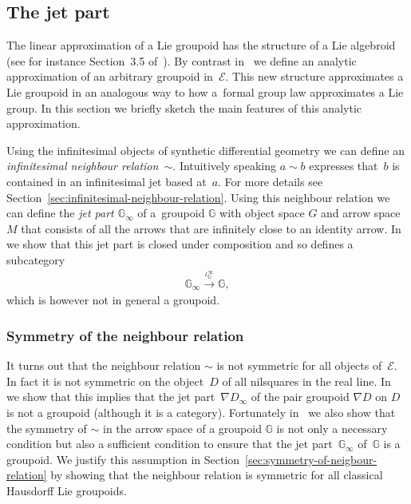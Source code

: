 \documentclass[pdftex]{sigma}
\numberwithin{equation}{section}
\begin{document}
\subsection{The jet part}

The linear approximation of a Lie groupoid has the structure of a Lie algebroid (see for instance Section~3.5 of~\cite{MR2157566}). By contrast in~\cite{burke-relative-to-local-models} we def\/ine an analytic approximation of an arbitrary groupoid in~$\mathcal{E}$. This new structure approximates a Lie groupoid in an analogous way to how a~formal group law approximates a Lie group. In this section we brief\/ly sketch the main features of this analytic approximation.

Using the inf\/initesimal objects of synthetic dif\/ferential geometry we can def\/ine an \emph{infinitesimal neighbour relation~$\sim$}. Intuitively speaking $a\sim b$ expresses that~$b$ is contained in an inf\/initesimal jet based at~$a$. For more details see Section~\ref{sec:infinitesimal-neighbour-relation}. Using this neighbour relation we can def\/ine the \emph{jet part $\mathbb{G}_{\infty}$} of a~groupoid $\mathbb{G}$ with object space $G$ and arrow space $M$ that consists of all the arrows that are inf\/initely close to an identity arrow. In~\cite{burke-relative-to-local-models} we show that this jet part is closed under composition and so def\/ines a subcategory
\begin{gather*}\mathbb{G}_{\infty} \xrightarrow{\iota_{\mathbb{G}}^{\infty}} \mathbb{G},\end{gather*}
which is however not in general a groupoid.

\subsubsection{Symmetry of the neighbour relation}

It turns out that the neighbour relation $\sim$ is not symmetric for all objects of~$\mathcal{E}$. In fact it is not symmetric on the object~$D$ of all nilsquares in the real line. In~\cite{burke-relative-to-local-models} we show that this implies that the jet part~$\nabla{D}_{\infty}$ of the pair groupoid $\nabla{D}$ on $D$ is not a groupoid (although it is a category). Fortunately in~\cite{burke-relative-to-local-models} we also show that the symmetry of $\sim$ in the arrow space of a groupoid $\mathbb{G}$ is not only a necessary condition but also a suf\/f\/icient condition to ensure that the jet part~$\mathbb{G}_{\infty}$ of~$\mathbb{G}$ is a groupoid. We justify this assumption in Section~\ref{sec:symmetry-of-neigbour-relation} by showing that the neighbour relation is symmetric for all classical Hausdorf\/f Lie groupoids.
\end{document}
